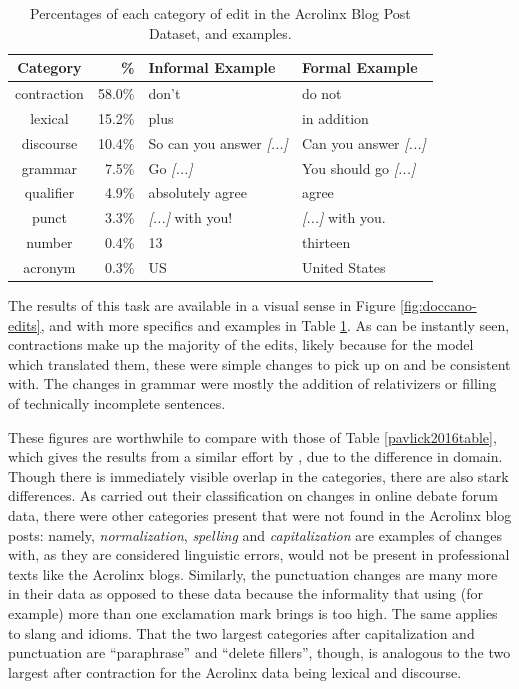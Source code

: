 \begin{table}[h]
\centering
 \begin{tabular}{||c | r | l | l ||} 
 \hline
 Category & \% & Informal Example & Formal Example \\ [0.3ex] 
 \hline\hline
 contraction & 58.0\% & don't & do not \\ 
 \hline
 lexical & 15.2\% & plus & in addition \\
 \hline
 discourse & 10.4\% & So can you answer \textit{[...]} & Can you answer \textit{[...]} \\
 \hline
 grammar & 7.5\% & Go \textit{[...]} & You should go \textit{[...]} \\
 \hline
 qualifier & 4.9\% & absolutely agree & agree \\
 \hline
 punct & 3.3\% & \textit{[...]} with you! & \textit{[...]} with you. \\
 \hline
 number & 0.4\% & 13 & thirteen \\
 \hline
 acronym & 0.3\% & US & United States \\
 \hline
\end{tabular}
\caption{Percentages of each category of edit in the Acrolinx Blog Post Dataset, and examples.}
\label{acro-edits-table}
\end{table}

The results of this task are available in a visual sense in Figure \ref{fig:doccano-edits}, and with more specifics and examples in Table \ref{acro-edits-table}. As can be instantly seen, contractions make up the majority of the edits, likely because for the model which translated them, these were simple changes to pick up on and be consistent with. The changes in grammar were mostly the addition of relativizers or filling of technically incomplete sentences.

These figures are worthwhile to compare with those of Table \ref{pavlick2016table}, which gives the results from a similar effort by \cite{pavlick2016empirical}, due to the difference in domain. Though there is immediately visible overlap in the categories, there are also stark differences. As \cite{pavlick2016empirical} carried out their classification on changes in online debate forum data, there were other categories present that were not found in the Acrolinx blog posts: namely, \textit{normalization}, \textit{spelling} and \textit{capitalization} are examples of changes with, as they are considered linguistic errors, would not be present in professional texts like the Acrolinx blogs. Similarly, the punctuation changes are many more in their data as opposed to these data because the informality that using (for example) more than one exclamation mark brings is too high. The same applies to slang and idioms. That the two largest categories after capitalization and punctuation are ``paraphrase'' and ``delete fillers'', though, is analogous to the two largest after contraction for the Acrolinx data being lexical and discourse.

